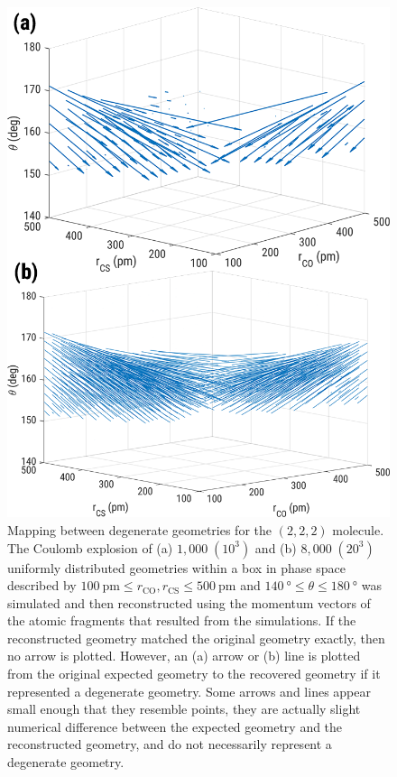 \begin{figure}
  \centering
  \includegraphics[width=\textwidth]{Plots/OCS222DegeneracyMap}
  \caption[Mapping between degenerate geometries for the  $(2,2,2)$ molecule.]
  {Mapping between degenerate geometries for the  $(2,2,2)$ molecule. The Coulomb explosion of (a) $1,000 \; (10^3)$ and (b) $8,000 \; (20^3)$ uniformly distributed geometries within a box in phase space described by $\SI{100}{\pico\meter} \le r_\mathrm{CO}, r_\mathrm{CS} \le \SI{500}{\pico\meter}$ and $\SI{140}{\degree} \le \theta \le \SI{180}{\degree}$ was simulated and then reconstructed using the momentum vectors of the atomic fragments that resulted from the simulations. If the reconstructed geometry matched the original geometry exactly, then no arrow is plotted. However, an (a) arrow or (b) line is plotted from the original expected geometry to the recovered geometry if it represented a degenerate geometry. Some arrows and lines appear small enough that they resemble points, they are actually slight numerical difference between the expected geometry and the reconstructed geometry, and do not necessarily represent a degenerate geometry.}
  \label{fig:OCS222DegeneracyMaps}
\end{figure}

